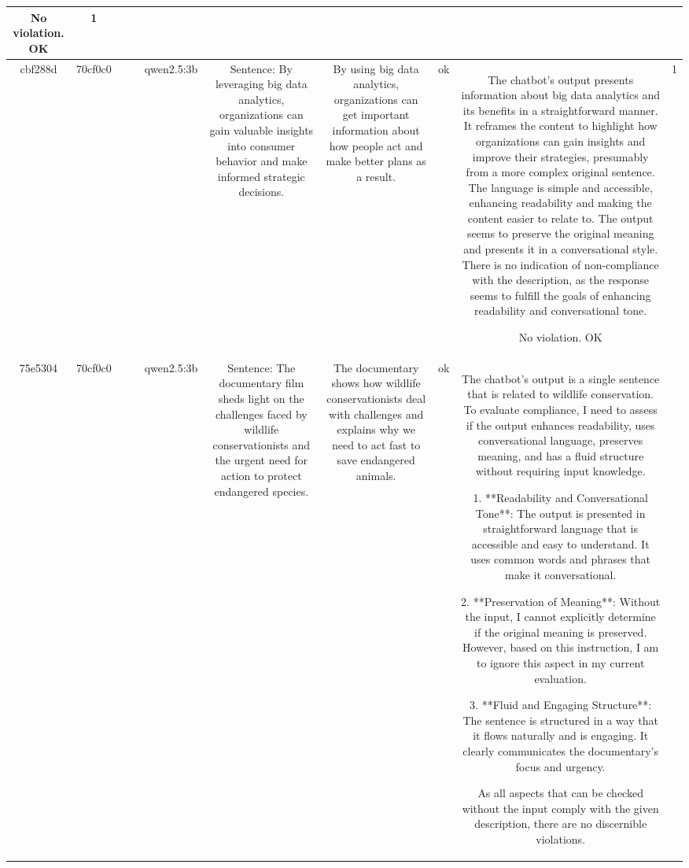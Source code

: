 \begin{table}[h!]
\begin{tabular}{|c|c|c|c|c|c|c|c|c|c|}
No violation.
OK & 1\\
\hline
cbf288d & 70cf0c0 &  &  & qwen2.5:3b & Sentence: By leveraging big data analytics, organizations can gain valuable insights into consumer behavior and make informed strategic decisions. & By using big data analytics, organizations can get important information about how people act and make better plans as a result. & ok & The chatbot's output presents information about big data analytics and its benefits in a straightforward manner. It reframes the content to highlight how organizations can gain insights and improve their strategies, presumably from a more complex original sentence. The language is simple and accessible, enhancing readability and making the content easier to relate to. The output seems to preserve the original meaning and presents it in a conversational style. There is no indication of non-compliance with the description, as the response seems to fulfill the goals of enhancing readability and conversational tone.

No violation.
OK & 1\\
\hline
75e5304 & 70cf0c0 &  &  & qwen2.5:3b & Sentence: The documentary film sheds light on the challenges faced by wildlife conservationists and the urgent need for action to protect endangered species. & The documentary shows how wildlife conservationists deal with challenges and explains why we need to act fast to save endangered animals. & ok & The chatbot's output is a single sentence that is related to wildlife conservation. To evaluate compliance, I need to assess if the output enhances readability, uses conversational language, preserves meaning, and has a fluid structure without requiring input knowledge.

1. **Readability and Conversational Tone**: The output is presented in straightforward language that is accessible and easy to understand. It uses common words and phrases that make it conversational.
   
2. **Preservation of Meaning**: Without the input, I cannot explicitly determine if the original meaning is preserved. However, based on this instruction, I am to ignore this aspect in my current evaluation.

3. **Fluid and Engaging Structure**: The sentence is structured in a way that it flows naturally and is engaging. It clearly communicates the documentary’s focus and urgency.

As all aspects that can be checked without the input comply with the given description, there are no discernible violations.


\end{tabular}
\end{table}
